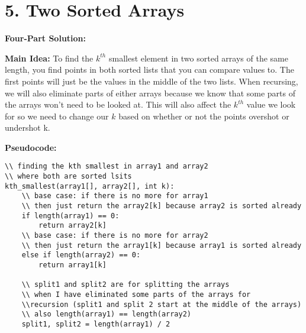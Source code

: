 \documentclass[11pt]{article}
\newenvironment{FourPartSolution}{\par{\bf Four-Part Solution:}}{\smallskip}
\newenvironment{mainIdea}{\par{\bf Main Idea:}}{\smallskip}
\newenvironment{pseudocode}{\par{\bf Pseudocode:}}{\smallskip}
\begin{document}
\newpage
\section*{5. Two Sorted Arrays}
\begin{FourPartSolution}
\begin{mainIdea}
To find the $k^{th}$ smallest element in two sorted arrays of the same length, you find points in both sorted lists that you can compare values to. The first points will just be the values in the middle of the two lists. When recursing, we will also eliminate parts of either arrays because we know that some parts of the arrays won't need to be looked at. This will also affect the $k^{th}$ value we look for so we need to change our $k$ based on whether or not the points overshot or undershot k.
\end{mainIdea}
\begin{pseudocode}
\begin{lstlisting}
\\ finding the kth smallest in array1 and array2
\\ where both are sorted lsits
kth_smallest(array1[], array2[], int k):
	\\ base case: if there is no more for array1
	\\ then just return the array2[k] because array2 is sorted already
	if length(array1) == 0:
		return array2[k]
	\\ base case: if there is no more for array2
	\\ then just return the array1[k] because array1 is sorted already
	else if length(array2) == 0:
		return array1[k]

	\\ split1 and split2 are for splitting the arrays
	\\ when I have eliminated some parts of the arrays for 
	\\recursion (split1 and split 2 start at the middle of the arrays)
	\\ also length(array1) == length(array2)
	split1, split2 = length(array1) / 2


\end{lstlisting}
\end{pseudocode}
\end{FourPartSolution}
\end{document}
